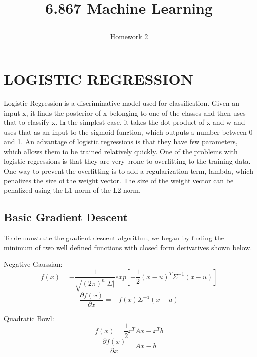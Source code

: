 \documentclass[a4paper,twoside]{article}
\begin{document}
\title{6.867 Machine Learning  \subtitle{Homework 2} }

\maketitle


\section{\uppercase{Logistic Regression}}

\noindent Logistic Regression is a discriminative model used for classification. Given an input x, it finds the posterior of x belonging to one of the classes and then uses that to classify x. In the simplest case, it takes the dot product of x and w and uses that as an input to the sigmoid function, which outputs a number between 0 and 1. An advantage of logistic regressions is that they have few parameters, which allows them to be trained relatively quickly. One of the problems with logistic regressions is that they are very prone to overfitting to the training data. One way to prevent the overfitting is to add a regularization term, lambda, which penalizes the size of the weight vector. The size of the weight vector can be penalized using the L1 norm of the L2 norm. 

\subsection{Basic Gradient Descent}

\noindent To demonstrate the gradient descent algorithm, we began by finding the minimum of two well defined functions with closed form derivatives shown below.

\medskip
\noindent Negative Gaussian:
\begin{equation}
f(x) = - \frac{1}{\sqrt{(2\pi)^n |\Sigma|}} exp[-\frac{1}{2} (x-u)^T\Sigma^{-1}(x-u)]
\end{equation}
\begin{equation}
\frac{\partial f(x)}{\partial x} = -f(x) \Sigma^{-1} (x-u)
\end{equation}

\noindent Quadratic Bowl:
\begin{equation}
f(x) = \frac{1}{2} x^T A x - x^T b
\end{equation}
\begin{equation}
\frac{\partial f(x)}{\partial x} = Ax - b
\end{equation}
\end{document}
